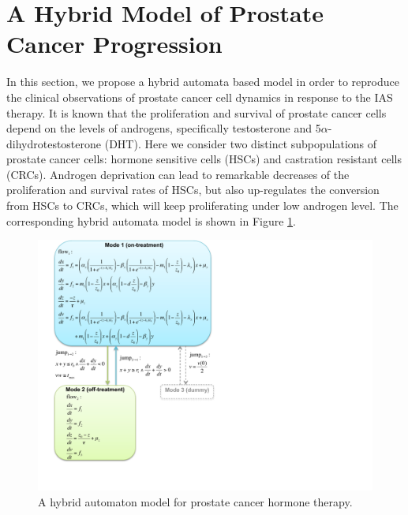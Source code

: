 \section{A Hybrid Model of Prostate Cancer Progression }\label{sec.model}

In this section, we propose a hybrid automata based model in order to reproduce the clinical observations \cite{bruchovsky06, bruchovsky07} of prostate cancer cell dynamics in response to the IAS therapy. It is known that the proliferation and survival of prostate cancer cells depend on the levels of androgens, specifically testosterone and 5$\alpha$-dihydrotestosterone (DHT).
Here we consider two distinct subpopulations of prostate cancer cells: hormone sensitive cells (HSCs) and castration resistant cells (CRCs). Androgen deprivation can lead to remarkable decreases of the proliferation and survival rates of HSCs, but also up-regulates the conversion from HSCs to CRCs, which will keep proliferating under low androgen level. %
The corresponding hybrid automata model is shown in Figure \ref{pmodel}. 



\begin{figure}[htb]
\centering
\includegraphics[scale=0.55]{fig-prostate3}
\caption{A hybrid automaton model for prostate cancer hormone therapy.}
\label{pmodel}
 \vspace{-0.3cm}
\end{figure}


